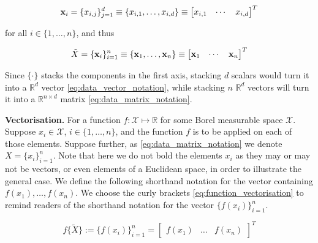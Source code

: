 \documentclass[twoside]{article} \usepackage{aistats2017}
\theoremstyle{definition}
\newcommand{\ds}[1]{\tilde{#1}}
\begin{document}
	\begin{equation}
	\mathbf{x}_{i} = \{x_{i, j}\}_{j = 1}^{d} \equiv \{x_{i, 1}, \dots, x_{i, d}\} \equiv \begin{bmatrix}
	x_{i, 1} & \cdots & x_{i, d}
	\end{bmatrix}^{T}
	\label{eq:data_vector_notation}
	\end{equation}
	
	for all $i \in \{1, \dots, n\}$, and thus

	\begin{equation}
		\ds{X} = \{\bvec{x}_{i}\}_{i = 1}^{n} \equiv \{\bvec{x}_{1}, \dots, \bvec{x}_{n}\} \equiv \begin{bmatrix}
			\bvec{x}_{1} & \cdots & \bvec{x}_{n}
		\end{bmatrix}^{T}
	\label{eq:data_matrix_notation}
	\end{equation}
		
	Since $\{ \cdot \}$ stacks the components in the first axis, stacking $d$ scalars would turn it into a $\mathbb{R}^{d}$ vector \eqref{eq:data_vector_notation}, while stacking $n$ $\mathbb{R}^{d}$ vectors will turn it into a $\mathbb{R}^{n \times d}$ matrix \eqref{eq:data_matrix_notation}.
	
	\textbf{Vectorisation.} For a function $f : \mathcal{X} \mapsto \mathbb{R}$ for some Borel measurable space $\mathcal{X}$. Suppose $x_{i} \in \mathcal{X}$, $i \in \{1, \dots, n\}$, and the function $f$ is to be applied on each of those elements. Suppose further, as \eqref{eq:data_matrix_notation} we denote $X = \{x_{i}\}_{i = 1}^{n}$. Note that here we do not bold the elements $x_{i}$ as they may or may not be vectors, or even elements of a Euclidean space, in order to illustrate the general case. We define the following shorthand notation for the vector containing $f(x_{1}), \dots, f(x_{n})$. We choose the curly brackets \eqref{eq:function_vectorisation} to remind readers of the shorthand notation for the vector $\{f(x_{i})\}_{i = 1}^{n}$.
	
	\begin{equation}
		f\{\ds{X}\} := \{f(x_{i})\}_{i = 1}^{n} = {\begin{bmatrix} f(x_{1}) & \dots & f(x_{n}) \end{bmatrix}}^{T}
	\label{eq:function_vectorisation}
	\end{equation}
	
\end{document}
